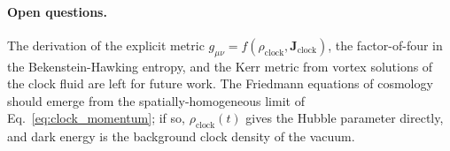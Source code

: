 \paragraph{Open questions.}
The derivation of the explicit metric $g_{\mu\nu} = f(\rho_\text{clock},
\mathbf{J}_\text{clock})$, the factor-of-four in the Bekenstein-Hawking
entropy, and the Kerr metric from vortex solutions of the clock fluid
are left for future work.
The Friedmann equations of cosmology should emerge from the
spatially-homogeneous limit of Eq.~\eqref{eq:clock_momentum}; if so,
$\rho_\text{clock}(t)$ gives the Hubble parameter directly, and dark
energy is the background clock density of the vacuum.
